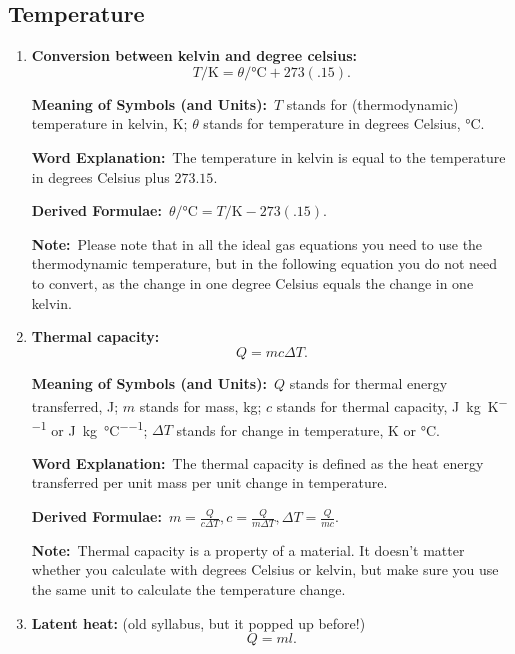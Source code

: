 \documentclass[8pt]{article}
\newcommand{\MeanSymb}{\textbf{Meaning of Symbols (and Units):}\ }
\newcommand{\WordExpl}{\textbf{Word Explanation:}\ }
\newcommand{\DeriForm}{\textbf{Derived Formulae:}\ }
\newcommand{\Note}{\textbf{Note:}\ }
\begin{document}
        \subsection{Temperature}
            \begin{enumerate}
                \item \textbf{Conversion between kelvin and degree celsius:}
                \[
                    T \unit{\per \kelvin} = \theta \unit{\per \degreeCelsius} + 273(.15).
                \]

                \MeanSymb \(T\) stands for (thermodynamic) temperature in kelvin, \unit{\kelvin}; \(\theta\) stands for temperature in degrees Celsius, \unit{\degreeCelsius}.

                \WordExpl The temperature in kelvin is equal to the temperature in degrees Celsius plus \(273.15\).

                \DeriForm \(\theta \unit{\per \degreeCelsius} = T \unit{\per \kelvin} - 273(.15)\).

                \Note Please note that in all the ideal gas equations you need to use the thermodynamic temperature, but in the following equation you do not need to convert, as the change in one degree Celsius equals the change in one kelvin.

                \item \textbf{Thermal capacity:}
                \[
                    Q = m c \Delta T.
                \]

                \MeanSymb \(Q\) stands for thermal energy transferred, \unit{\joule}; \(m\) stands for mass, \unit{\kilogram}; \(c\) stands for thermal capacity, \unit{\joule \per \kilogram \per \kelvin} or \unit{\joule \per \kilogram \per \degreeCelsius}; \(\Delta T\) stands for change in temperature, \unit{\kelvin} or \unit{\degreeCelsius}.

                \WordExpl The thermal capacity is defined as the heat energy transferred per unit mass per unit change in temperature.

                \DeriForm \(m = \frac{Q}{c \Delta T}, c = \frac{Q}{m \Delta T}, \Delta T = \frac{Q}{mc}\).

                \Note Thermal capacity is a property of a material. It doesn't matter whether you calculate with degrees Celsius or kelvin, but make sure you use the same unit to calculate the temperature change.

                \item \textbf{Latent heat:} (old syllabus, but it popped up before!)
                \[
                    Q = ml.
                \]


\end{enumerate}
\end{document}
